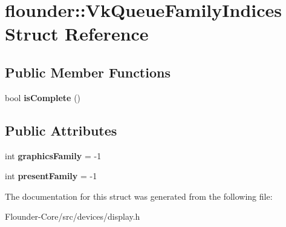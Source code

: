 \hypertarget{structflounder_1_1_vk_queue_family_indices}{}\section{flounder\+:\+:Vk\+Queue\+Family\+Indices Struct Reference}
\label{structflounder_1_1_vk_queue_family_indices}
\subsection*{Public Member Functions}
\begin{DoxyCompactItemize}
\item 
\mbox{\label{structflounder_1_1_vk_queue_family_indices_a91e6a9ce4568cc9891eec81d70593f1c}} 
bool {\bfseries is\+Complete} ()
\end{DoxyCompactItemize}
\subsection*{Public Attributes}
\begin{DoxyCompactItemize}
\item 
\mbox{\label{structflounder_1_1_vk_queue_family_indices_aa486af139da32ba230a410b350c02651}} 
int {\bfseries graphics\+Family} = -\/1
\item 
\mbox{\label{structflounder_1_1_vk_queue_family_indices_a690805bccbc4fd027889998658b12b05}} 
int {\bfseries present\+Family} = -\/1
\end{DoxyCompactItemize}


The documentation for this struct was generated from the following file\+:\begin{DoxyCompactItemize}
\item 
Flounder-\/\+Core/src/devices/display.\+h\end{DoxyCompactItemize}
